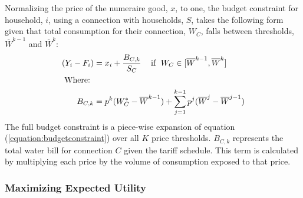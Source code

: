 \documentclass[12pt]{article}
\begin{document}
Normalizing the price of the numeraire good, $x$, to one, the budget constraint for household, $i$, using a connection with households, $S$, takes the following form given that total consumption for their connection, $W_C$, falls between thresholds, $\overline{W}^{k-1}$ and $\overline{W}^{k}$:
\begin{align}
\label{equation:budgetconstraint}
\begin{split}
(Y_i - F_i) &= x_i +   \dfrac{  B_{C,k}  }{S_C}    \hspace{.3cm} \text{ if } \hspace{.1cm} W_C \in [\overline{W}^{k-1},\overline{W}^{k}] \\
\text{Where: }& \\
B_{C,k}  &= p^{k} (W_{C}^{*} - \overline{W}^{k-1}) +\sum_{j=1}^{k-1}  p^{j}(\overline{W}^{j}-\overline{W}^{j-1}) 
\end{split}
\end{align}
The full budget constraint is a piece-wise expansion of equation (\ref{equation:budgetconstraint}) over all $K$ price thresholds.  $B_{C,k}$ represents the total water bill for connection $C$ given the tariff schedule.  This term is calculated by multiplying each price by the volume of consumption exposed to that price.

\subsubsection{Maximizing Expected Utility}
\end{document}

